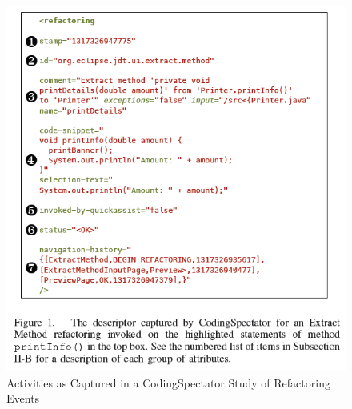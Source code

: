 \begin{figure}[t]
 \centering
\includegraphics[width=0.5\columnwidth]{AnalyzingUsageData/codingSpectator}
\caption{Activities as Captured in a CodingSpectator Study of Refactoring Events}
\label{fig:activit}
\end{figure}

